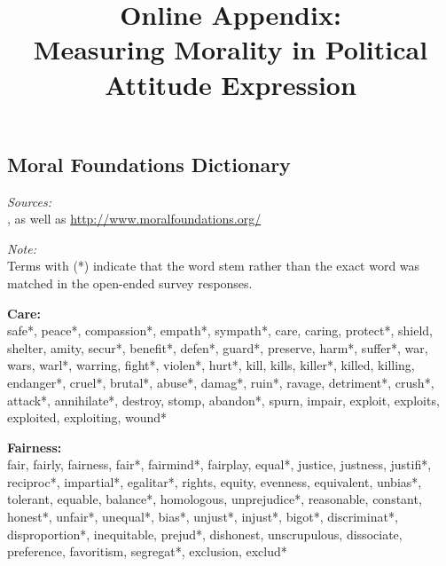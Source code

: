 \documentclass[12pt]{article}
\title{{\large Online Appendix:}\\Measuring Morality in Political Attitude Expression}
\date{}
\begin{document}
\renewcommand\thesubsection{\Roman{subsection}}

\maketitle
\appendices

\thispagestyle{empty}
\startcontents[sections]
\clearpage \setcounter{page}{1}

\begin{flushleft}\footnotesize
\section{Moral Foundations Dictionary}\label{app:dict}
\textit{Sources:}\\
\citet{graham2009liberals}, as well as \url{http://www.moralfoundations.org/}
\vspace{.5cm}

\textit{Note:}\\
Terms with (*) indicate that the word stem rather than the exact word was matched in the open-ended survey responses.
\vspace{.5cm}

\textbf{Care:}\\
safe*, peace*, compassion*, empath*, sympath*, care, caring, protect*, shield, shelter, amity, secur*, benefit*, defen*, guard*, preserve, harm*, suffer*, war, wars, warl*, warring, fight*, violen*, hurt*, kill, kills, killer*, killed, killing, endanger*, cruel*, brutal*, abuse*, damag*, ruin*, ravage, detriment*, crush*, attack*, annihilate*, destroy, stomp, abandon*, spurn, impair, exploit, exploits, exploited, exploiting, wound*
\vspace{.5cm}

\textbf{Fairness:}\\
fair, fairly, fairness, fair*, fairmind*, fairplay, equal*, justice, justness, justifi*, reciproc*, impartial*, egalitar*, rights, equity, evenness, equivalent, unbias*, tolerant, equable, balance*, homologous, unprejudice*, reasonable, constant, honest*, unfair*, unequal*, bias*, unjust*, injust*, bigot*, discriminat*, disproportion*, inequitable, prejud*, dishonest, unscrupulous, dissociate, preference, favoritism, segregat*, exclusion, exclud*
\vspace{.5cm}


\end{flushleft}
\end{document}
